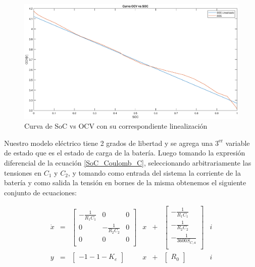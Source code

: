 \documentclass[10pt,a4paper]{article}
\begin{document}
	\clearpage
	
	\begin{figure}[h!]
		\begin{center}
			\includegraphics[width=1\textwidth]{SoC_vs_OCV.eps}
			\caption{Curva de SoC vs OCV con su correspondiente linealización }
			\label{SoC_vs_OCV}
		\end{center}
	\end{figure}
	
	\noindent Nuestro modelo eléctrico tiene 2 grados de libertad y se agrega 
    una $\mathrm{3^{er}}$ variable de estado que es el estado de carga de la 
    batería. Luego tomando la expresión diferencial de la ecuación 
    \ref{SoC_Coulomb_C}, seleccionando arbitrariamente las tensiones en 
    $C_1$ y $C_2$, y tomando como entrada del sistema la corriente de la 
    batería y como salida la tensión en bornes de la misma obtenemos el 
    siguiente conjunto de ecuaciones:
	
	\begin{equation}
		\begin{array}{llcllcl}
			\dot{x} & = & \begin{bmatrix}
				-\frac{1}{R_1 C_1} & 			0 		& 0 \\
				0				   & -\frac{1}{R_2 C_2} & 0 \\
				0      			   &   			0       & 0 \\
			\end{bmatrix} & x & + & 	\begin{bmatrix}
				-\frac{1}{R_1 C_1} \\
				-\frac{1}{R_2 C_2}  \\
				-\frac{1}{3600 S_{C,a}}\\
			\end{bmatrix} & i \\
			y & = & \begin{bmatrix}
				-1-1-K_e 
			\end{bmatrix} & x & + & \begin{bmatrix}
				R_0
			\end{bmatrix} & i \\
		\end{array}
	\end{equation}
	
\end{document}
